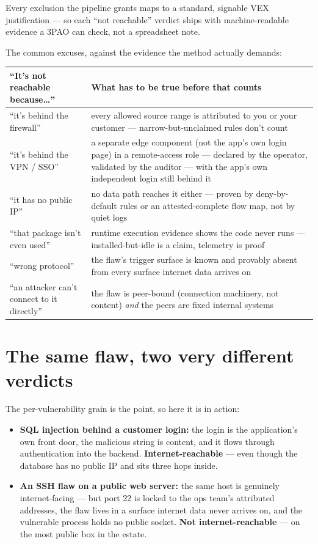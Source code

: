 \documentclass[11pt]{article}
\begin{document}
Every exclusion the pipeline grants maps to a standard, signable VEX justification
--- so each ``not reachable'' verdict ships with machine-readable evidence a 3PAO
can check, not a spreadsheet note.

The common excuses, against the evidence the method actually demands:

\begin{center}
\begin{tabular}{@{}p{2.35in}p{3.45in}@{}}
\toprule
\textbf{``It's not reachable because\ldots''} & \textbf{What has to be true before that counts} \\
\midrule
``it's behind the firewall'' & every allowed source range is attributed to you or
your customer --- narrow-but-unclaimed rules don't count \\
``it's behind the VPN / SSO'' & a separate edge component (not the app's own
login page) in a remote-access role --- declared by the operator, validated by
the auditor --- with the app's own independent login still behind it \\
``it has no public IP'' & no data path reaches it either --- proven by
deny-by-default rules or an attested-complete flow map, not by quiet logs \\
``that package isn't even used'' & runtime execution evidence shows the code never
runs --- installed-but-idle is a claim, telemetry is proof \\
``wrong protocol'' & the flaw's trigger surface is known and provably absent from
every surface internet data arrives on \\
``an attacker can't connect to it directly'' & the flaw is peer-bound (connection
machinery, not content) \emph{and} the peers are fixed internal systems \\
\bottomrule
\end{tabular}
\end{center}

\section*{The same flaw, two very different verdicts}
The per-vulnerability grain is the point, so here it is in action:

\begin{itemize}[leftmargin=1.5em]
\item \textbf{SQL injection behind a customer login:} the login is the
  application's own front door, the malicious string is content, and it flows
  through authentication into the backend. \textbf{Internet-reachable} --- even
  though the database has no public IP and sits three hops inside.
\item \textbf{An SSH flaw on a public web server:} the same host is genuinely
  internet-facing --- but port 22 is locked to the ops team's attributed
  addresses, the flaw lives in a surface internet data never arrives on, and the
  vulnerable process holds no public socket. \textbf{Not internet-reachable} ---
  on the most public box in the estate.
\end{itemize}
\end{document}
